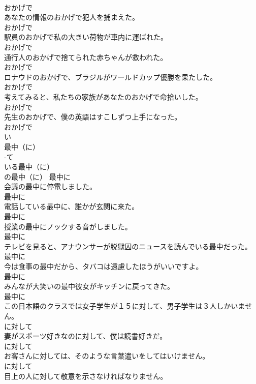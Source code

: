 \documentclass[8pt]{extreport}
\begin{document}
\begin{CJK}{UTF8}{min}
\\	おかげで
\\	あなたの情報のおかげで犯人を捕まえた。	
\\	おかげで
\\	駅員のおかげで私の大きい荷物が車内に運ばれた。	
\\	おかげで
\\	通行人のおかげで捨てられた赤ちゃんが救われた。	
\\	おかげで
\\	ロナウドのおかげで、ブラジルがワールドカップ優勝を果たした。	
\\	おかげで
\\	考えてみると、私たちの家族があなたのおかげで命拾いした。	
\\	おかげで
\\	先生のおかげで、僕の英語はすこしずつ上手になった。	
\\	おかげで
\\	い
\\	最中（に）	
\\	-て
\\	いる最中（に）	
\\	の最中（に）	最中に
\\	会議の最中に停電しました。	
\\	最中に
\\	電話している最中に、誰かが玄関に来た。	
\\	最中に
\\	授業の最中にノックする音がしました。	
\\	最中に
\\	テレビを見ると、アナウンサーが脱獄囚のニュースを読んでいる最中だった。	
\\	最中に
\\	今は食事の最中だから、タバコは遠慮したほうがいいですよ。	
\\	最中に
\\	みんなが大笑いの最中彼女がキッチンに戻ってきた。	
\\	最中に
\\	この日本語のクラスでは女子学生が１５に対して、男子学生は３人しかいません。	
\\	に対して
\\	妻がスポーツ好きなのに対して、僕は読書好きだ。	
\\	に対して
\\	お客さんに対しては、そのような言葉遣いをしてはいけません。	
\\	に対して
\\	目上の人に対して敬意を示さなければなりません。	

\end{CJK}
\end{document}

